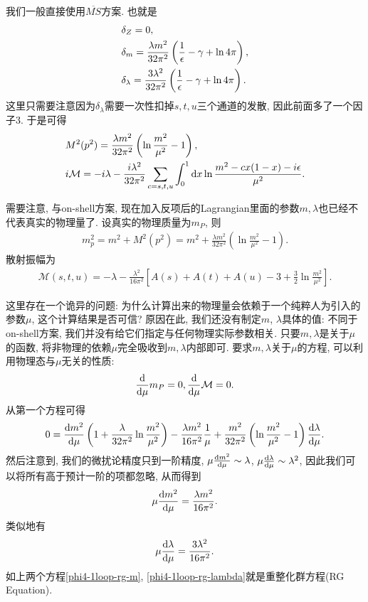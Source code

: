 我们一般直接使用$\overline{MS}$方案. 也就是
\begin{align}
    & \delta_Z=0,\notag\\
    & \delta_m=\frac{\lambda m^2}{32\pi^2}\left(\frac1\epsilon-\gamma+\ln4\pi\right),\\
    & \delta_\lambda=\frac{3\lambda^2}{32\pi^2}\left(\frac1\epsilon-\gamma+\ln4\pi\right).
\end{align}
这里只需要注意因为$\delta_\lambda$需要一次性扣掉$s, t, u$三个通道的发散, 因此前面多了一个因子$3$. 于是可得
\begin{align}
    & M^2(p^2)=\frac{\lambda m^2}{32\pi^2}\left(\ln\frac{m^2}{\mu^2}-1\right),\\
    & i\mathcal M=-i\lambda-\frac{i\lambda^2}{32\pi^2}\sum_{c=s,t,u}\int_0^1\mathrm dx\ln\frac{m^2-cx(1-x)-i\epsilon}{\mu^2}.
\end{align}

需要注意, 与on-shell方案, 现在加入反项后的Lagrangian里面的参数$m, \lambda$也已经不代表真实的物理量了. 设真实的物理质量为$m_P$, 则
\begin{align}
    m_p^2=m^2+M^2(p^2)=m^2+\frac{\lambda m^2}{32\pi^2}\left(\ln\frac{m^2}{\mu^2}-1\right).
\end{align}
散射振幅为
\begin{align}
    \mathcal M(s, t, u)=-\lambda-\frac{\lambda^2}{16\pi^2}\left[A(s)+A(t)+A(u)-3+\frac32\ln\frac{m^2}{\mu^2}\right].
\end{align}

这里存在一个诡异的问题: 为什么计算出来的物理量会依赖于一个纯粹人为引入的参数$\mu$, 这个计算结果是否可信? 原因在此, 我们还没有制定$m$, $\lambda$具体的值: 不同于on-shell方案, 我们并没有给它们指定与任何物理实际参数相关. 只要$m, \lambda$是关于$\mu$的函数, 将非物理的依赖$\mu$完全吸收到$m, \lambda$内部即可. 要求$m, \lambda$关于$\mu$的方程, 可以利用物理态与$\mu$无关的性质:
\begin{align}
    \frac{\mathrm d}{\mathrm d\mu}m_P=0, \frac{\mathrm d}{\mathrm d\mu}\mathcal M=0.
\end{align}
从第一个方程可得
\begin{align}
    0=\frac{\mathrm dm^2}{\mathrm d\mu}\left(1+\frac\lambda{32\pi^2}\ln\frac{m^2}{\mu^2}\right)-\frac{\lambda m^2}{16\pi^2}\frac1\mu+\frac{m^2}{32\pi^2}\left(\ln\frac{m^2}{\mu^2}-1\right)\frac{\mathrm d\lambda}{\mathrm d\mu}.
\end{align}
然后注意到, 我们的微扰论精度只到一阶精度, $\mu\frac{\mathrm dm^2}{\mathrm d\mu}\sim\lambda$, $\mu\frac{\mathrm d\lambda}{\mathrm d\mu}\sim\lambda^2$, 因此我们可以将所有高于预计一阶的项都忽略, 从而得到
\begin{align}
    \mu\frac{\mathrm dm^2}{\mathrm d\mu}=\frac{\lambda m^2}{16\pi^2}.\label{phi4-1loop-rg-m}
\end{align}
类似地有
\begin{align}
    \mu\frac{\mathrm d\lambda}{\mathrm d\mu}=\frac{3\lambda^2}{16\pi^2}.\label{phi4-1loop-rg-lambda}
\end{align}
如上两个方程\eqref{phi4-1loop-rg-m}, \eqref{phi4-1loop-rg-lambda}就是重整化群方程(RG Equation).

